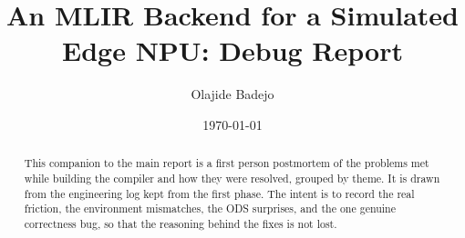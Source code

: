 \documentclass[11pt]{article}
\title{An MLIR Backend for a Simulated Edge NPU: Debug Report}
\author{Olajide Badejo}
\date{\today}
\begin{document}
\maketitle

\begin{abstract}
This companion to the main report is a first person postmortem of the problems met
while building the compiler and how they were resolved, grouped by theme. It is
drawn from the engineering log kept from the first phase. The intent is to record
the real friction, the environment mismatches, the ODS surprises, and the one
genuine correctness bug, so that the reasoning behind the fixes is not lost.
\end{abstract}





\end{document}
